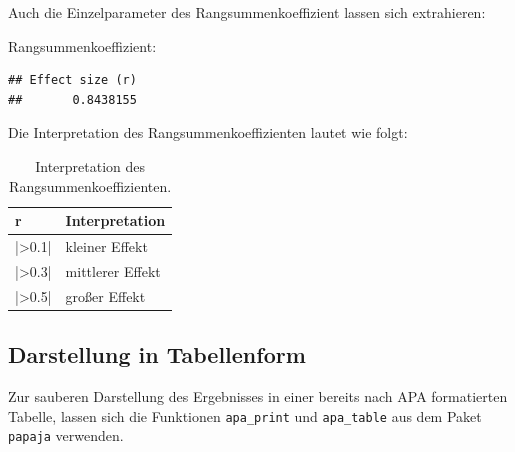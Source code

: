 \documentclass[
]{book}
\newenvironment{Shaded}{\begin{snugshade}}{\end{snugshade}}
\newcommand{\AttributeTok}[1]{\textcolor[rgb]{0.77,0.63,0.00}{#1}}
\newcommand{\FunctionTok}[1]{\textcolor[rgb]{0.00,0.00,0.00}{#1}}
\newcommand{\NormalTok}[1]{#1}
\newcommand{\SpecialCharTok}[1]{\textcolor[rgb]{0.00,0.00,0.00}{#1}}
\begin{document}
Auch die Einzelparameter des Rangsummenkoeffizient lassen sich extrahieren:

Rangsummenkoeffizient:

\begin{Shaded}
\end{Shaded}

\begin{verbatim}
## Effect size (r) 
##       0.8438155
\end{verbatim}

Die Interpretation des Rangsummenkoeffizienten lautet wie folgt:

\begin{table}[tbp]

\begin{center}
\begin{threeparttable}

\caption{\label{tab:unnamed-chunk-281}Interpretation des Rangsummenkoeffizienten.}

\begin{tabular}{ll}
\toprule
r & \multicolumn{1}{c}{Interpretation}\\
\midrule
|>0.1| & kleiner Effekt\\
|>0.3| & mittlerer Effekt\\
|>0.5| & großer Effekt\\
\bottomrule
\end{tabular}

\end{threeparttable}
\end{center}

\end{table}

\hypertarget{darstellung-in-tabellenform-4}{%
\subsection{Darstellung in Tabellenform}\label{darstellung-in-tabellenform-4}}

Zur sauberen Darstellung des Ergebnisses in einer bereits nach APA formatierten Tabelle, lassen sich die Funktionen \texttt{apa\_print} und \texttt{apa\_table} aus dem Paket \texttt{papaja} verwenden.
\end{document}
